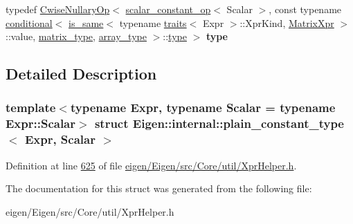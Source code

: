 \begin{DoxyCompactItemize}
typedef \hyperlink{group___core___module_class_eigen_1_1_cwise_nullary_op}{Cwise\+Nullary\+Op}$<$ \hyperlink{struct_eigen_1_1internal_1_1scalar__constant__op}{scalar\+\_\+constant\+\_\+op}$<$ Scalar $>$, const typename \hyperlink{struct_eigen_1_1internal_1_1conditional}{conditional}$<$ \hyperlink{struct_eigen_1_1internal_1_1is__same}{is\+\_\+same}$<$ typename \hyperlink{struct_eigen_1_1internal_1_1traits}{traits}$<$ Expr $>$\+::Xpr\+Kind, \hyperlink{struct_eigen_1_1_matrix_xpr}{Matrix\+Xpr} $>$\+::value, \hyperlink{group___core___module_class_eigen_1_1_matrix}{matrix\+\_\+type}, \hyperlink{group___core___module_class_eigen_1_1_array}{array\+\_\+type} $>$\+::\hyperlink{group___core___module_class_eigen_1_1_cwise_nullary_op}{type} $>$ {\bfseries type}
\end{DoxyCompactItemize}


\subsection{Detailed Description}
\subsubsection*{template$<$typename Expr, typename Scalar = typename Expr\+::\+Scalar$>$\newline
struct Eigen\+::internal\+::plain\+\_\+constant\+\_\+type$<$ Expr, Scalar $>$}



Definition at line \hyperlink{eigen_2_eigen_2src_2_core_2util_2_xpr_helper_8h_source_l00625}{625} of file \hyperlink{eigen_2_eigen_2src_2_core_2util_2_xpr_helper_8h_source}{eigen/\+Eigen/src/\+Core/util/\+Xpr\+Helper.\+h}.



The documentation for this struct was generated from the following file\+:\begin{DoxyCompactItemize}
\item 
eigen/\+Eigen/src/\+Core/util/\+Xpr\+Helper.\+h\end{DoxyCompactItemize}
